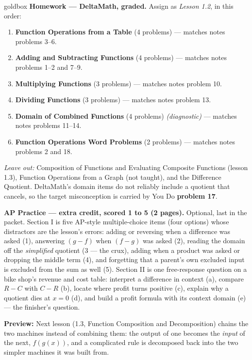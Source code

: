 \documentclass[10pt]{article}
\begin{document}
\begin{skillbox}{goldbox}
\textbf{Homework --- DeltaMath, graded.} Assign as \textit{Lesson 1.2}, in this order:
\begin{enumerate}[itemsep=1pt,topsep=2pt]
  \item \textbf{Function Operations from a Table} (4 problems) --- matches notes
        problems 3--6.
  \item \textbf{Adding and Subtracting Functions} (4 problems) --- matches notes
        problems 1--2 and 7--9.
  \item \textbf{Multiplying Functions} (3 problems) --- matches notes problem 10.
  \item \textbf{Dividing Functions} (3 problems) --- matches notes problem 13.
  \item \textbf{Domain of Combined Functions} (4 problems)
        \textit{(diagnostic)} --- matches notes problems 11--14.
  \item \textbf{Function Operations Word Problems} (2 problems) --- matches notes
        problems 2 and 18.
\end{enumerate}
\textit{Leave out:} Composition of Functions and Evaluating Composite Functions
(lesson 1.3), Function Operations from a Graph (not taught), and the Difference
Quotient. DeltaMath's domain items do not reliably include a quotient that
cancels, so the target misconception is carried by You Do \textbf{problem 17}.

\textbf{AP Practice --- extra credit, scored 1 to 5 (2 pages).} Optional, last in the packet.
Section I is five AP-style multiple-choice items (four options) whose
distractors are the lesson's errors: adding or reversing when a difference was
asked (1), answering $(g-f)$ when $(f-g)$ was asked (2), reading the domain off
the \emph{simplified} quotient (3 --- the crux), adding when a product was asked
or dropping the middle term (4), and forgetting that a parent's own excluded
input is excluded from the sum as well (5). Section II is one free-response
question on a bike shop's revenue and cost table: interpret a difference in
context (a), compare $R-C$ with $C-R$ (b), locate where profit turns positive
(c), explain why a quotient dies at $x = 0$ (d), and build a profit formula with
its context domain (e) --- the finisher's question.

\textbf{Preview:} Next lesson (1.3, Function Composition and Decomposition)
chains the two machines instead of combining them: the output of one becomes the
\textit{input} of the next, $f(g(x))$, and a complicated rule is decomposed back
into the two simpler machines it was built from.
\end{skillbox}
\end{document}
